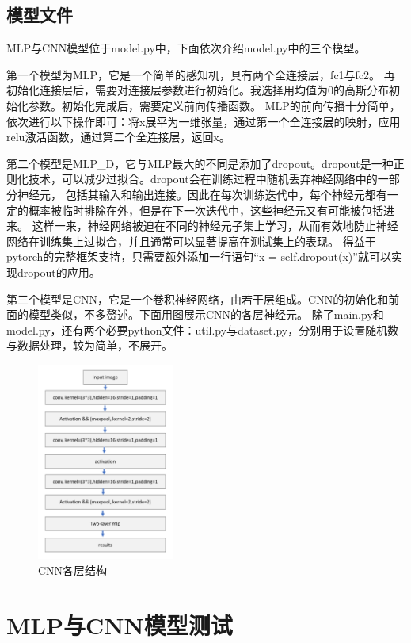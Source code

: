 \documentclass[UTF8]{ctexart}
\begin{document}
\subsection{模型文件}
MLP与CNN模型位于model.py中，下面依次介绍model.py中的三个模型。

第一个模型为MLP，它是一个简单的感知机，具有两个全连接层，fc1与fc2。
再初始化连接层后，需要对连接层参数进行初始化。我选择用均值为0的高斯分布初始化参数。初始化完成后，需要定义前向传播函数。
MLP的前向传播十分简单，依次进行以下操作即可：将x展平为一维张量，通过第一个全连接层的映射，应用relu激活函数，通过第二个全连接层，返回x。

第二个模型是MLP\_D，它与MLP最大的不同是添加了dropout。dropout是一种正则化技术，可以减少过拟合。dropout会在训练过程中随机丢弃神经网络中的一部分神经元，
包括其输入和输出连接。因此在每次训练迭代中，每个神经元都有一定的概率被临时排除在外，但是在下一次迭代中，这些神经元又有可能被包括进来。
这样一来，神经网络被迫在不同的神经元子集上学习，从而有效地防止神经网络在训练集上过拟合，并且通常可以显著提高在测试集上的表现。
得益于pytorch的完整框架支持，只需要额外添加一行语句“x = self.dropout(x)”就可以实现dropout的应用。

第三个模型是CNN，它是一个卷积神经网络，由若干层组成。CNN的初始化和前面的模型类似，不多赘述。下面用图展示CNN的各层神经元。
除了main.py和model.py，还有两个必要python文件：util.py与dataset.py，分别用于设置随机数与数据处理，较为简单，不展开。
\begin{figure}[h]
    \centering
    \includegraphics[width=0.4\textwidth]{CNN_MODEL.png}
    \caption*{CNN各层结构}
\end{figure}

\section{MLP与CNN模型测试}
\end{document}
